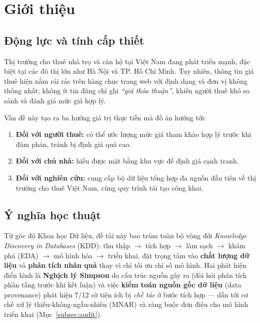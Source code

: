 \section{Giới thiệu}
\label{sec:intro}

\subsection{Động lực và tính cấp thiết}

Thị trường cho thuê nhà trọ và căn hộ tại Việt Nam đang phát triển mạnh,
đặc biệt tại các đô thị lớn như Hà Nội và TP. Hồ Chí Minh.
Tuy nhiên, thông tin giá thuê hiện nằm rải rác trên hàng chục trang web với định dạng
và đơn vị không thống nhất; không ít tin đăng chỉ ghi \textit{``giá thỏa thuận''},
khiến người thuê khó so sánh và đánh giá mức giá hợp lý.

Vấn đề này tạo ra ba hướng giá trị thực tiễn mà đồ án hướng tới:
\begin{enumerate}[leftmargin=*, itemsep=3pt]
  \item \textbf{Đối với người thuê:} có thể ước lượng mức giá tham khảo hợp lý
        trước khi đàm phán, tránh bị định giá quá cao.
  \item \textbf{Đối với chủ nhà:} hiểu được mặt bằng khu vực để định giá cạnh tranh.
  \item \textbf{Đối với nghiên cứu:} cung cấp bộ dữ liệu tổng hợp đa nguồn đầu tiên
        về thị trường cho thuê Việt Nam, cùng quy trình tái tạo công khai.
\end{enumerate}

\subsection{Ý nghĩa học thuật}

Từ góc độ Khoa học Dữ liệu, đề tài này bao trùm toàn bộ vòng đời
\textit{Knowledge Discovery in Databases} (KDD): thu thập $\to$ tích hợp $\to$ làm sạch
$\to$ khám phá (EDA) $\to$ mô hình hóa $\to$ triển khai, đặt trọng tâm vào
\textbf{chất lượng dữ liệu} và \textbf{phân tích nhân quả} thay vì chỉ tối ưu chỉ số mô hình.
Hai phát hiện điển hình là \textbf{Nghịch lý Simpson} do cấu trúc nguồn gây ra
(đòi hỏi phân tích phân tầng trước khi kết luận) và việc \textbf{kiểm toán nguồn gốc
dữ liệu} (data provenance) phát hiện 7/12 cờ tiện ích bị \textit{chế tác} ở bước tích hợp —
dẫn tới cơ chế xử lý thiếu-không-ngẫu-nhiên (MNAR) và ràng buộc đơn điệu
cho mô hình triển khai (Mục~\ref{subsec:audit}).


